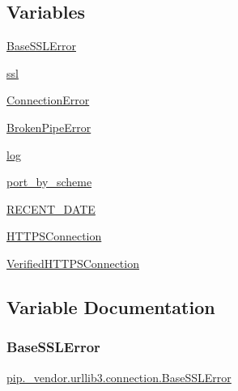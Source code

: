 \subsection*{Variables}
\begin{DoxyCompactItemize}
\item 
\hyperlink{namespacepip_1_1__vendor_1_1urllib3_1_1connection_aff5f169c9b0b5146204881b817106ff6}{Base\+S\+S\+L\+Error}
\item 
\hyperlink{namespacepip_1_1__vendor_1_1urllib3_1_1connection_a9b4868ea30cffebcbaaeae824c13d81d}{ssl}
\item 
\hyperlink{namespacepip_1_1__vendor_1_1urllib3_1_1connection_a6404f235d98071b2bd6156dab53ad430}{Connection\+Error}
\item 
\hyperlink{namespacepip_1_1__vendor_1_1urllib3_1_1connection_abff1f341241cb28094f6b792925504ad}{Broken\+Pipe\+Error}
\item 
\hyperlink{namespacepip_1_1__vendor_1_1urllib3_1_1connection_a0c317a64974ae60c3a35f12432cb4383}{log}
\item 
\hyperlink{namespacepip_1_1__vendor_1_1urllib3_1_1connection_ae9f61d0022401e9744c83788d88a2d8e}{port\+\_\+by\+\_\+scheme}
\item 
\hyperlink{namespacepip_1_1__vendor_1_1urllib3_1_1connection_a5abde6a9b03a653bd99770a33c1d0566}{R\+E\+C\+E\+N\+T\+\_\+\+D\+A\+TE}
\item 
\hyperlink{namespacepip_1_1__vendor_1_1urllib3_1_1connection_a9723edb7274c902a9329662f3535cef0}{H\+T\+T\+P\+S\+Connection}
\item 
\hyperlink{namespacepip_1_1__vendor_1_1urllib3_1_1connection_a7e3f4765ca6223cd60bc4272574f9336}{Verified\+H\+T\+T\+P\+S\+Connection}
\end{DoxyCompactItemize}


\subsection{Variable Documentation}
\mbox{\label{namespacepip_1_1__vendor_1_1urllib3_1_1connection_aff5f169c9b0b5146204881b817106ff6}} 
\subsubsection{\texorpdfstring{Base\+S\+S\+L\+Error}{BaseSSLError}}
{\footnotesize\ttfamily \hyperlink{classpip_1_1__vendor_1_1urllib3_1_1connection_1_1BaseSSLError}{pip.\+\_\+vendor.\+urllib3.\+connection.\+Base\+S\+S\+L\+Error}}

